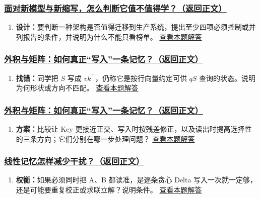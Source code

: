 \subsubsection*{\hyperref[check:23e-tech-judgement]{面对新模型与新缩写，怎么判断它值不值得学？（返回正文）}}\begin{enumerate}[label={},leftmargin=4.8em,itemsep=4pt]
\item[\textbf{C4-43.}] \label{exercise:C4-43}\label{extension:23e-tech-judgement:4}\textbf{设计：}要判断一种架构是否值得迁移到生产系统，提出至少四项必须控制或并列报告的条件，并说明为什么不能只看榜单。 \hyperref[answerpiece:23e-tech-judgement:4]{查看本题解答}
\end{enumerate}

\subsubsection*{\hyperref[check:04-key-value-outer-product]{外积与矩阵：如何真正“写入”一条记忆？（返回正文）}}\begin{enumerate}[label={},leftmargin=4.8em,itemsep=4pt]
\item[\textbf{C4-44.}] \label{exercise:C4-44}\label{extension:04-key-value-outer-product:4}\textbf{找错：}同学把 $S$ 写成 $vk^\top$，仍称它是按行向量约定可供 $qS$ 查询的状态。说明为何形状或方向不匹配。 \hyperref[answerpiece:04-key-value-outer-product:4]{查看本题解答}
\end{enumerate}

\subsubsection*{\hyperref[check:05-memory-interference]{外积与矩阵：如何真正“写入”一条记忆？（返回正文）}}\begin{enumerate}[label={},leftmargin=4.8em,itemsep=4pt]
\item[\textbf{C4-45.}] \label{exercise:C4-45}\label{extension:05-memory-interference:4}\textbf{方案：}比较让 Key 更接近正交、写入时按残差修正，以及读出时提高选择性的三条方向；它们分别在哪一步处理问题？ \hyperref[answerpiece:05-memory-interference:4]{查看本题解答}
\end{enumerate}

\subsubsection*{\hyperref[check:06-better-linear-memory]{线性记忆怎样减少干扰？（返回正文）}}\begin{enumerate}[label={},leftmargin=4.8em,itemsep=4pt]
\item[\textbf{C4-46.}] \label{exercise:C4-46}\label{extension:06-better-linear-memory:4}\textbf{权衡：}如果必须同时把 A、B 都读准，是逐条贪心 Delta 写入一次就一定够，还是可能要重复校正或求联立解？说明条件。 \hyperref[answerpiece:06-better-linear-memory:4]{查看本题解答}
\end{enumerate}


